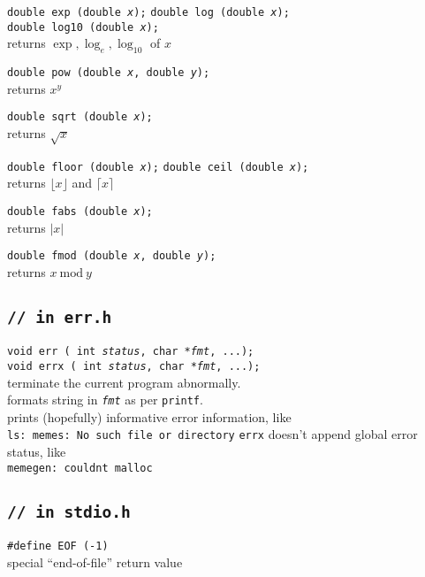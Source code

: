 \documentclass[8pt]{article}
\newcommand{\Cc}[1]{\texttt{#1}}
\newcommand{\cmt}[1]{\textcolor[gray]{.3}{\texttt{#1}}} %
\newcommand{\cpp}[1]{\textcolor{black!20!cyan}{\texttt{\##1}}} %
\newcommand{\ty}[1]{\textcolor{blue!80}{\texttt{#1}}} %
\newcommand{\kv}[1]{\textcolor{red!40!black}{\texttt{#1}}} %
\newcommand{\val}[1]{\texttt{#1}} %
\newcommand{\fn}[1]{\texttt{#1}} %
\newcommand{\var}[1]{\texttt{\textit{#1}}} %
\newcommand{\htab}{\hspace*{2em}} %
\newcommand{\Cq}{\textquotesingle} %
\begin{document}
\begin{multicols}{3}
\Cc{\ty{double} \fn{exp}\,(\ty{double} \var{x});} \hfill
\Cc{\ty{double} \fn{log}\,(\ty{double} \var{x});} \\
\Cc{\ty{double} \fn{log10}\,(\ty{double} \var{x});} \\
\htab returns $\exp,\log_{e},\log_{10}$ of $x$

\Cc{\ty{double} \fn{pow}\,(\ty{double} \var{x}, \ty{double} \var{y});} \\
\htab returns $x^y$

\Cc{\ty{double} \fn{sqrt}\,(\ty{double} \var{x});} \\
\htab returns $\sqrt{x}$

\Cc{\ty{double} \fn{floor}\,(\ty{double} \var{x});} \hfill
\Cc{\ty{double} \fn{ceil}\,(\ty{double} \var{x});} \\
\htab returns $\lfloor x\rfloor$ and $\lceil x\rceil$

\Cc{\ty{double} \fn{fabs}\,(\ty{double} \var{x});} \\
\htab returns $\left|x\right|$

\Cc{\ty{double} \fn{fmod}\,(\ty{double} \var{x}, \ty{double} \var{y});} \\
\htab returns $x~\textrm{mod}~y$


\subsection*{\Cc{\cmt{// in err.h}}}

\Cc{\ty{void} \fn{err}\,(%
    \ty{int} \var{status}, %
    \ty{char *}\var{fmt}, ...);} \\
\Cc{\ty{void} \fn{errx}\,(%
    \ty{int} \var{status}, %
    \ty{char *}\var{fmt}, ...);} \\
\htab terminate the current program abnormally. \\
\htab formats string in \var{fmt} as per \fn{printf}. \\
\htab prints (hopefully) informative error information, like \\
\htab\htab\texttt{ls: memes: No such file or directory}
\htab \fn{errx} doesn't append global error status, like \\
\htab\htab\texttt{memegen: couldn\Cq t malloc}

\subsection*{\Cc{\cmt{// in stdio.h}}}

\Cc{\cpp{define} \kv{EOF} (\val{-1})} \\
\htab special ``end-of-file'' return value


\end{multicols}
\end{document}

